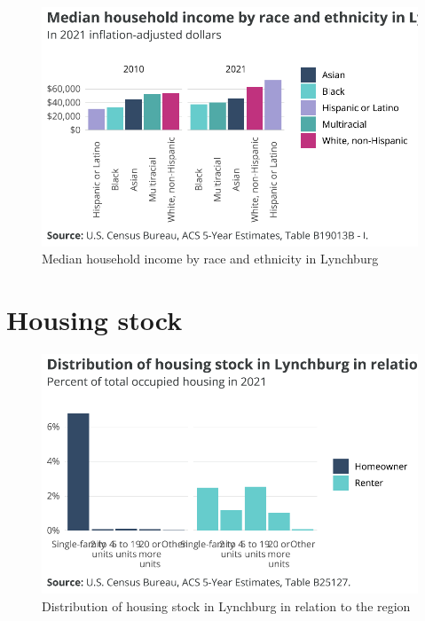 \documentclass[
  letterpaper,
  DIV=11,
  numbers=noendperiod]{scrreprt}
\begin{document}
\begin{figure}[H]

{\centering \includegraphics{./part-3-3_files/figure-pdf/fig-race-inc-1.pdf}

}

\caption{\label{fig-race-inc}Median household income by race and
ethnicity in Lynchburg}

\end{figure}

\hypertarget{housing-stock-2}{%
\section{Housing stock}\label{housing-stock-2}}

\begin{figure}[H]

{\centering \includegraphics{./part-3-3_files/figure-pdf/fig-structure-1.pdf}

}

\caption{\label{fig-structure}Distribution of housing stock in Lynchburg
in relation to the region}

\end{figure}
\end{document}
